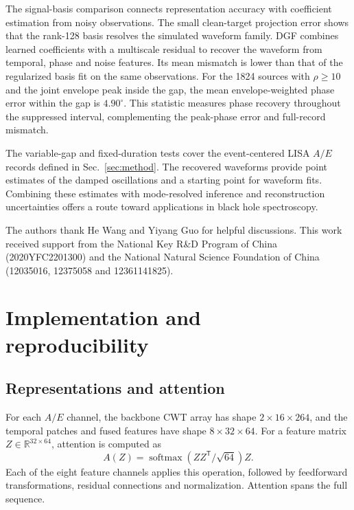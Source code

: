 \documentclass[10pt,prd,aps,a4paper,twocolumn,superscriptaddress,nofootinbib,floatfix]{revtex4-2}
\begin{document}
The signal-basis comparison connects representation accuracy with coefficient estimation from noisy observations. The small clean-target projection error shows that the rank-128 basis resolves the simulated waveform family. DGF combines learned coefficients with a multiscale residual to recover the waveform from temporal, phase and noise features. Its mean mismatch is lower than that of the regularized basis fit on the same observations. For the 1824 sources with $\rho\ge10$ and the joint envelope peak inside the gap, the mean envelope-weighted phase error within the gap is $4.90^\circ$. This statistic measures phase recovery throughout the suppressed interval, complementing the peak-phase error and full-record mismatch.

The variable-gap and fixed-duration tests cover the event-centered LISA $A/E$ records defined in Sec.~\ref{sec:method}. The recovered waveforms provide point estimates of the damped oscillations and a starting point for waveform fits. Combining these estimates with mode-resolved inference and reconstruction uncertainties offers a route toward applications in black hole spectroscopy.

\begin{acknowledgments}
The authors thank He Wang and Yiyang Guo for helpful discussions. This work received support from the National Key R\&D Program of China (2020YFC2201300) and the National Natural Science Foundation of China (12035016, 12375058 and 12361141825).

\end{acknowledgments}
\onecolumngrid
\clearpage
\twocolumngrid
\appendix
\section{Implementation and reproducibility}\label{app:model_analysis}
\subsection{Representations and attention}
For each $A/E$ channel, the backbone CWT array has shape $2\times16\times264$, and the temporal patches and fused features have shape $8\times32\times64$. For a feature matrix $Z\in\mathbb R^{32\times64}$, attention is computed as
\begin{equation}
A(Z)=\operatorname{softmax}(ZZ^{\mathsf T}/\sqrt{64})Z.
\end{equation}
Each of the eight feature channels applies this operation, followed by feedforward transformations, residual connections and normalization. Attention spans the full sequence.
\end{document}
